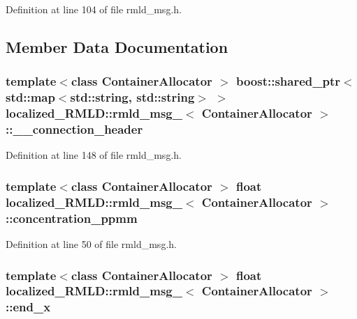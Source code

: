 Definition at line 104 of file rmld\_\-msg.h.



\subsection{Member Data Documentation}
\subsubsection[{\_\-\_\-connection\_\-header}]{\setlength{\rightskip}{0pt plus 5cm}template$<$class ContainerAllocator $>$ boost::shared\_\-ptr$<$std::map$<$std::string, std::string$>$ $>$ {\bf localized\_\-RMLD::rmld\_\-msg\_\-}$<$ ContainerAllocator $>$::{\bf \_\-\_\-connection\_\-header}}\label{structlocalized__RMLD_1_1rmld__msg___a574d6702bc0df36442c744400a640517}


Definition at line 148 of file rmld\_\-msg.h.

\subsubsection[{concentration\_\-ppmm}]{\setlength{\rightskip}{0pt plus 5cm}template$<$class ContainerAllocator $>$ float {\bf localized\_\-RMLD::rmld\_\-msg\_\-}$<$ ContainerAllocator $>$::{\bf concentration\_\-ppmm}}\label{structlocalized__RMLD_1_1rmld__msg___aba3fb4be5a934577782c4a4df47b7eba}


Definition at line 50 of file rmld\_\-msg.h.

\subsubsection[{end\_\-x}]{\setlength{\rightskip}{0pt plus 5cm}template$<$class ContainerAllocator $>$ float {\bf localized\_\-RMLD::rmld\_\-msg\_\-}$<$ ContainerAllocator $>$::{\bf end\_\-x}}\label{structlocalized__RMLD_1_1rmld__msg___ac6cb8a16f2f071433de1599921bcd131}


